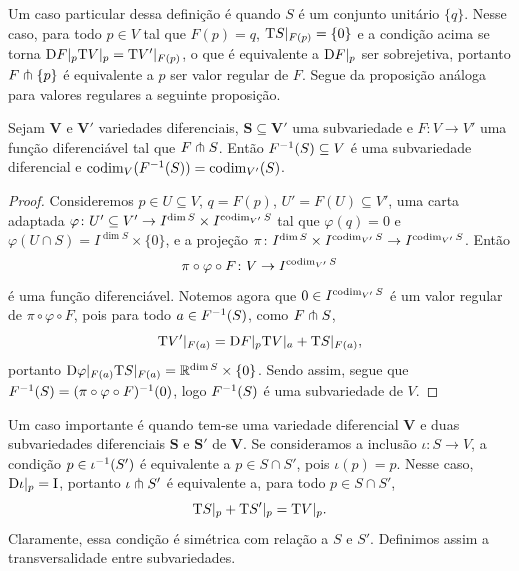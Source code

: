 Um caso particular dessa definição é quando $S$ é um conjunto unitário $\{q\}$. Nesse caso, para todo $p \in V$ tal que $F(p)=q$,  $\mathrm{T} S|_{F(p)} = \{0\}$ e a condição acima se torna $\mathrm{D} F|_p\mathrm{T} V|_p = \mathrm{T} V'|_{F(p)}$, o que é equivalente a $\mathrm{D} F|_p$ ser sobrejetiva, portanto $F \pitchfork \{p\}$ é equivalente a $p$ ser valor regular de $F$. Segue da proposição análoga para valores regulares a seguinte proposição.

\begin{proposition}
Sejam $\bm V$ e $\bm V'$ variedades diferenciais, $\bm S \subseteq \bm V'$ uma subvariedade e $F\colon V \to V'$ uma função diferenciável tal que $F \pitchfork S$. Então $F^{-1}(S) \subseteq V$ é uma subvariedade diferencial e $\operatorname{codim}_V(F^{-1}(S)) = \operatorname{codim}_{V'}(S)$.
\end{proposition}
\begin{proof}
Consideremos $p \in U \subseteq V$, $q=F(p)$, $U'=F(U) \subseteq V'$, uma carta adaptada $\varphi\colon U' \subseteq V' \to I^{\dim S} \times I^{\operatorname{codim}_{V'} S}$ tal que $\varphi(q)=0$ e $\varphi(U \cap S) = I^{\dim S} \times \{0\}$, e a projeção $\pi\colon I^{\dim S} \times I^{\operatorname{codim}_{V'} S} \to I^{\operatorname{codim}_{V'} S}$. Então
	\begin{equation*}
	\pi \circ \varphi \circ F\colon V \to I^{\operatorname{codim}_{V'} S}
	\end{equation*}
é uma função diferenciável. Notemos agora que $0 \in I^{\operatorname{codim}_{V'} S}$ é um valor regular de $\pi \circ \varphi \circ F$, pois para todo $a \in F^{-1}(S)$, como $F \pitchfork S$,
	\begin{equation*}
	\mathrm{T} V'|_{F(a)} = \mathrm{D} F|_p \mathrm{T} V|_a + \mathrm{T} S|_{F(a)},
	\end{equation*}
portanto $\mathrm{D} \varphi|_{F(a)} \mathrm{T} S|_{F(a)} = \mathbb{R}^{\dim S} \times \{0\}$. Sendo assim, segue que $F^{-1}(S) = (\pi \circ \varphi \circ F)^{-1}(0)$, logo $F^{-1}(S)$ é uma subvariedade de $V$.
\end{proof}

Um caso importante é quando tem-se uma variedade diferencial $\bm V$ e duas subvariedades diferenciais $\bm S$ e $\bm S'$ de $\bm V$. Se consideramos a inclusão $\iota\colon S \to V$, a condição $p \in \iota^{-1}(S')$ é equivalente a $p \in S \cap S'$, pois $\iota(p)=p$. Nesse caso, $\mathrm{D}\iota|_p=\mathrm{I}$, portanto $\iota \pitchfork S'$ é equivalente a, para todo $p \in S \cap S'$,
	\begin{equation*}
	\mathrm{T} S|_p + \mathrm{T} S'|_{p} = \mathrm{T} V|_{p}.
	\end{equation*}
Claramente, essa condição é simétrica com relação a $S$ e $S'$. Definimos assim a transversalidade entre subvariedades.

